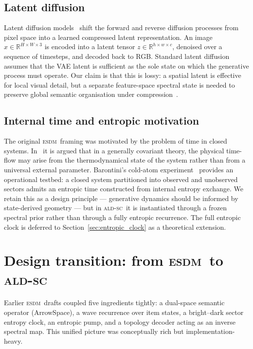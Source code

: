 \documentclass[11pt]{article}
\newcommand{\ESDM}{\textsc{esdm}}
\newcommand{\ALDSC}{\textsc{ald-sc}}
\newcommand{\R}{\mathbb{R}}
\begin{document}
    \subsection{Latent diffusion}
    \label{sec:latent_diffusion}
    Latent diffusion models~\cite{Rombach2022} shift the forward and
    reverse diffusion processes from pixel space into a learned
    compressed latent representation. An image $x \in \R^{H \times W
    \times 3}$ is encoded into a latent tensor $z \in \R^{h \times w
    \times c}$, denoised over a sequence of timesteps, and decoded
    back to RGB. Standard latent diffusion assumes that the VAE latent
    is sufficient as the sole state on which the generative process
    must operate. Our claim is that this is lossy: a spatial latent is
    effective for local visual detail, but a separate feature-space
    spectral state is needed to preserve global semantic organisation
    under compression~\cite{MoriondoAzizi2026}.

    \subsection{Internal time and entropic motivation}
    \label{sec:internal_time}
    The original \ESDM~framing was motivated by the problem of time
    in closed systems. In~\cite{ConnesRovelli1994} it is argued that
    in a generally covariant theory, the physical time-flow may arise
    from the thermodynamical state of the system rather than from a
    universal external parameter. Barontini's cold-atom
    experiment~\cite{Barontini2026} provides an operational testbed:
    a closed system partitioned into observed and unobserved sectors
    admits an entropic time constructed from internal entropy
    exchange. We retain this as a design principle --- generative
    dynamics should be informed by state-derived geometry --- but in
    \ALDSC~it is instantiated through a frozen spectral prior rather
    than through a fully entropic recurrence. The full entropic clock
    is deferred to Section~\ref{sec:entropic_clock} as a theoretical
    extension.

    \section{Design transition: from \ESDM~to \ALDSC}
    \label{sec:transition}

    Earlier \ESDM~drafts coupled five ingredients tightly: a
    dual-space semantic operator (ArrowSpace), a wave recurrence over
    item states, a bright--dark sector entropy clock, an entropic
    pump, and a topology decoder acting as an inverse spectral map.
    This unified picture was conceptually rich but
    implementation-heavy.
\end{document}
